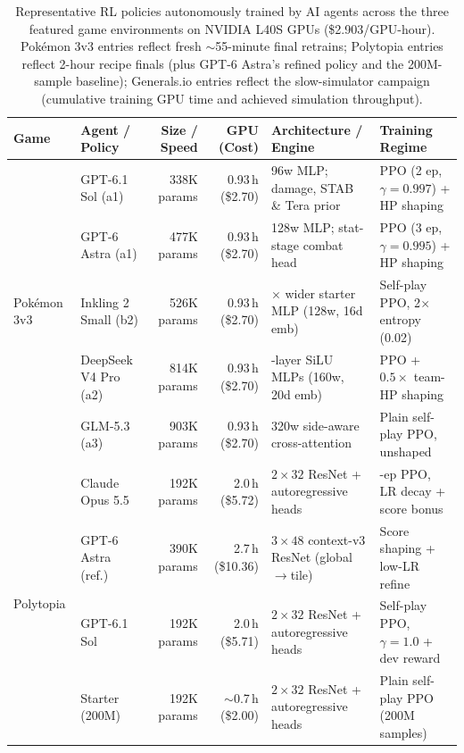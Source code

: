 \documentclass[11pt,letterpaper]{article}
\renewcommand{\arraystretch}{1.16}
\newcommand{\pokemon}{Pok\'emon}
\begin{document}
\begin{table}[htbp]
\centering
\caption{Representative RL policies autonomously trained by AI agents across the three featured game environments on NVIDIA L40S GPUs (\$2.903/GPU-hour). \pokemon{} 3v3 entries reflect fresh $\sim$55-minute final retrains; Polytopia entries reflect 2-hour recipe finals (plus GPT-6 Astra's refined policy and the 200M-sample baseline); Generals.io entries reflect the slow-simulator campaign (cumulative training GPU time and achieved simulation throughput).}
\label{tab:showcase}
\scriptsize
\renewcommand{\arraystretch}{1.10}
\setlength{\tabcolsep}{4pt}
\begin{tabularx}{\textwidth}{@{}llrr>{\raggedright\arraybackslash}p{3.65cm}>{\raggedright\arraybackslash}X@{}}
\toprule
\textbf{Game} & \textbf{Agent / Policy} & \textbf{Size / Speed} & \textbf{GPU (Cost)} & \textbf{Architecture / Engine} & \textbf{Training Regime} \\
\midrule
\multirow{5}{*}{\pokemon{} 3v3}
  & GPT-6.1 Sol (a1)     & 338K params & 0.93\,h (\$2.70) & 96w MLP; damage, STAB \& Tera prior & PPO (2 ep, $\gamma{=}0.997$) + HP shaping \\
  & GPT-6 Astra (a1)     & 477K params & 0.93\,h (\$2.70) & 128w MLP; stat-stage combat head & PPO (3 ep, $\gamma{=}0.995$) + HP shaping \\
  & Inkling 2 Small (b2) & 526K params & 0.93\,h (\$2.70) & 2$\times$ wider starter MLP (128w, 16d emb) & Self-play PPO, 2$\times$ entropy (0.02) \\
  & DeepSeek V4 Pro (a2) & 814K params & 0.93\,h (\$2.70) & 2-layer SiLU MLPs (160w, 20d emb) & PPO + $0.5\times$ team-HP shaping \\
  & GLM-5.3 (a3)         & 903K params & 0.93\,h (\$2.70) & 320w side-aware cross-attention & Plain self-play PPO, unshaped \\
\midrule
\multirow{4}{*}{Polytopia}
  & Claude Opus 5.5      & 192K params & 2.0\,h (\$5.72)  & $2{\times}32$ ResNet + autoregressive heads & 2-ep PPO, LR decay + score bonus \\
  & GPT-6 Astra (ref.)   & 390K params & 2.7\,h (\$10.36) & $3{\times}48$ context-v3 ResNet (global$\to$tile) & Score shaping + low-LR refine \\
  & GPT-6.1 Sol          & 192K params & 2.0\,h (\$5.71)  & $2{\times}32$ ResNet + autoregressive heads & Self-play PPO, $\gamma{=}1.0$ + dev reward \\
  & Starter (200M)       & 192K params & $\sim$0.7\,h (\$2.00) & $2{\times}32$ ResNet + autoregressive heads & Plain self-play PPO (200M samples) \\

\end{tabularx}
\end{table}
\end{document}
